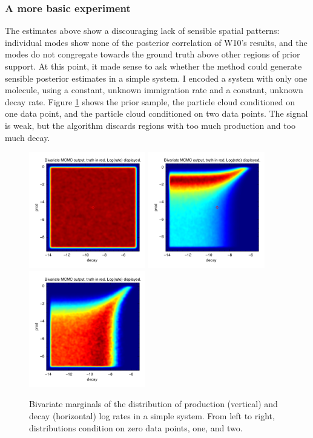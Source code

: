 \documentclass{article}
\begin{document}
\subsubsection{A more basic experiment}
The estimates above show a discouraging lack of sensible spatial patterns: individual modes show none of the posterior correlation of W10's results, and the modes do not congregate towards the ground truth above other regions of prior support. At this point, it made sense to ask whether the method could generate sensible posterior estimates in a simple system. I encoded a system with only one molecule, using a constant, unknown immigration rate and a constant, unknown decay rate. Figure \ref{fig:easy_test} shows the prior sample, the particle cloud conditioned on one data point, and the particle cloud conditioned on two data points. The signal is weak, but the algorithm discards regions with too much production and too much decay.

\begin{figure}[h!]
\begin{center}
\includegraphics[height=2in,width=2in]{easy_test/dist0_contour_decay_prod.png}
\includegraphics[height=2in,width=2in]{easy_test/dist1_contour_decay_prod.png}
\includegraphics[height=2in,width=2in]{easy_test/dist2_contour_decay_prod.png}
\caption{Bivariate marginals of the distribution of production (vertical) and decay (horizontal) log rates in a simple system. From left to right, distributions condition on zero data points, one, and two. \label{fig:easy_test}}
\end{center}
\end{figure}
\end{document}
